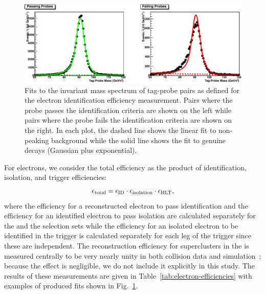 \begin{figure}[p]
  \centering
  \includegraphics[width=\textwidth,clip=true]{matplotlib/efficiencies/fits-electronid-crop}
  \caption[Example fits to electron tag-probe pairs]{Fits to the invariant mass spectrum of tag-probe pairs as defined for the \wtoenu electron identification efficiency measurement.  Pairs where the probe passes the identification criteria are shown on the left while pairs where the probe fails the identification criteria are shown on the right.  In each plot, the dashed line shows the linear fit to non-peaking background while the solid line shows the fit to genuine \ztoee decays (Gaussian plus exponential).}
  \label{fig:electron-fits}
\end{figure}

For electrons, we consider the total efficiency as the product of identification, isolation, and trigger efficiencies:
\begin{equation}
  \label{eq:factorized-eff-electron}
  \epsilon_\mathrm{total} = \epsilon_\mathrm{ID} \cdot \epsilon_\mathrm{isolation} \cdot \epsilon_\mathrm{HLT},
\end{equation}
where the efficiency for a reconstructed electron to pass identification \effid{} and the efficiency for an identified electron to pass isolation \effiso{} are calculated separately for the \ztoee and the \wtoenu selection sets while the efficiency for an isolated electron to be identified in the trigger \effhlt{} is calculated separately for each leg of the trigger since these are independent.  The reconstruction efficiency for superclusters in the \ecal{} is measured centrally to be very nearly unity in both collision data and simulation~\cite{CMS-PAS-EGM-10-004}; because the effect is negligible, we do not include it explicitly in this study.  The results of these measurements are given in Table~\ref{tab:electron-efficiencies} with examples of produced fits shown in Fig.~\ref{fig:electron-fits}.

